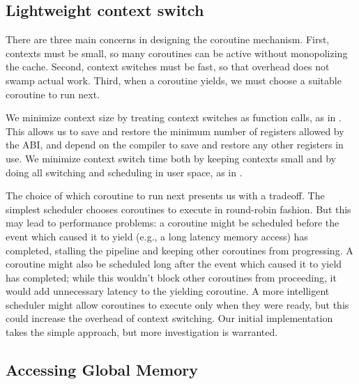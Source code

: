 \documentclass{acm_proc_article-sp}
\begin{document}
\subsection{Lightweight context switch}

There are three main concerns in designing the coroutine
mechanism. First, contexts must be small, so many coroutines can be
active without monopolizing the cache. Second, context switches must
be fast, so that overhead does not swamp actual work. Third, when a
coroutine yields, we must choose a suitable coroutine to run next.

We minimize context size by treating context switches as function
calls, as in \cite{charm}. This allows us to save and restore the
minimum number of registers allowed by the ABI, and depend on the
compiler to save and restore any other registers in use. We minimize
context switch time both by keeping contexts small and by doing all
switching and scheduling in user space, as in .

The choice of which coroutine to run next presents us with a
tradeoff. The simplest scheduler chooses coroutines to execute in
round-robin fashion. But this may lead to performance problems: a
coroutine might be scheduled before the event which caused it to yield (e.g., a long latency memory access)
has completed, stalling the pipeline and keeping other coroutines from
progressing. A coroutine might also be scheduled long after the event
which caused it to yield has completed; while this wouldn't block
other coroutines from proceeding, it would add unnecessary latency to
the yielding coroutine. A more intelligent scheduler might allow
coroutines to execute only when they were ready, but this could
increase the overhead of context switching. Our initial implementation
takes the simple approach, but more investigation is warranted.

\subsection{Accessing Global Memory}


\end{document}
